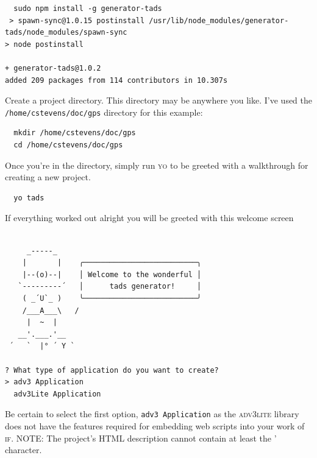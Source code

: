 \begin{lstlisting}
  sudo npm install -g generator-tads
 > spawn-sync@1.0.15 postinstall /usr/lib/node_modules/generator-tads/node_modules/spawn-sync
> node postinstall

+ generator-tads@1.0.2
added 209 packages from 114 contributors in 10.307s
\end{lstlisting}
Create a project directory. This directory may be anywhere you like. I've used
the \texttt{/home/cstevens/doc/gps} directory for this example:

\begin{lstlisting}
  mkdir /home/cstevens/doc/gps
  cd /home/cstevens/doc/gps
\end{lstlisting}
Once you're in the directory, simply run \textsc{yo} to be greeted with a
walkthrough for creating a new project.
\begin{lstlisting}
  yo tads
\end{lstlisting}
If everything worked out alright you will be greeted with this welcome screen
\begin{verbatim}

     _-----_
    |       |    ╭──────────────────────────╮
    |--(o)--|    │ Welcome to the wonderful │
   `---------´   │      tads generator!     │
    ( _´U`_ )    ╰──────────────────────────╯
    /___A___\   /
     |  ~  |
   __'.___.'__
 ´   `  |° ´ Y `

? What type of application do you want to create?
> adv3 Application
  adv3Lite Application
\end{verbatim}
Be certain to select the first option, \texttt{adv3 Application} as the
\textsc{adv3lite} library does not have the features required for embedding web
scripts into your work of \textsc{if}.
NOTE: The project's HTML description cannot contain  at least the ' character.

